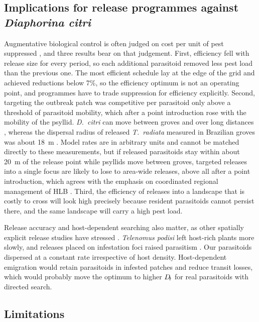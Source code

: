 \subsection*{Implications for release programmes against \emph{Diaphorina citri}}

Augmentative biological control is often judged on cost per unit of pest suppressed \citep{collier2004,vanlenteren2012}, and three results bear on that judgement. First, efficiency fell with release size for every period, so each additional parasitoid removed less pest load than the previous one. The most efficient schedule lay at the edge of the grid and achieved reductions below 7\%, so the efficiency optimum is not an operating point, and programmes have to trade suppression for efficiency explicitly. Second, targeting the outbreak patch was competitive per parasitoid only above a threshold of parasitoid mobility, which after a point introduction rose with the mobility of the psyllid. \emph{D.~citri} can move between groves and over long distances \citep{boina2009,lewisrosenblum2015}, whereas the dispersal radius of released \emph{T.~radiata} measured in Brazilian groves was about 18~m \citep{marin2023}. Model rates are in arbitrary units and cannot be matched directly to these measurements, but if released parasitoids stay within about 20~m of the release point while psyllids move between groves, targeted releases into a single focus are likely to lose to area-wide releases, above all after a point introduction, which agrees with the emphasis on coordinated regional management of HLB \citep{bassanezi2020}. Third, the efficiency of releases into a landscape that is costly to cross will look high precisely because resident parasitoids cannot persist there, and the same landscape will carry a high pest load.

Release accuracy and host-dependent searching also matter, as other spatially explicit release studies have stressed \citep{ARCASIM1996,Diatraea2024,SITMetapopulation2026}. \emph{Telenomus podisi} left host-rich plants more slowly, and releases placed on infestation foci raised parasitism \citep{PatchDispersal2026}. Our parasitoids dispersed at a constant rate irrespective of host density. Host-dependent emigration would retain parasitoids in infested patches and reduce transit losses, which would probably move the optimum to higher $D_{\!t}$ for real parasitoids with directed search.

\subsection*{Limitations}

